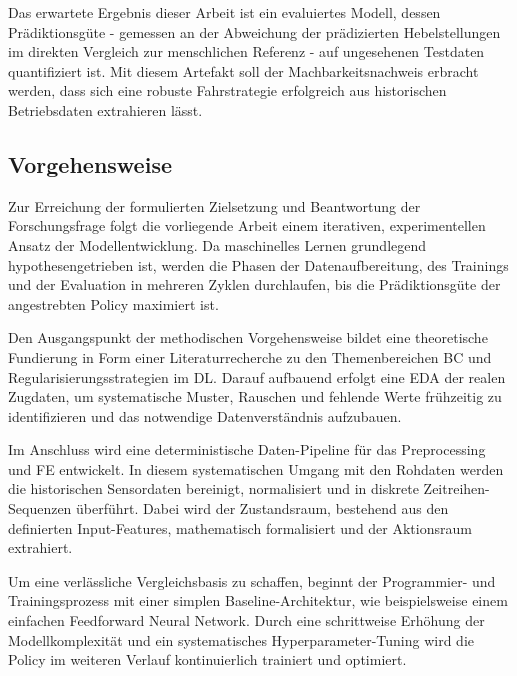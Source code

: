 Das erwartete Ergebnis dieser Arbeit ist ein evaluiertes Modell, dessen Prädiktionsgüte - gemessen an der Abweichung der prädizierten Hebelstellungen im direkten Vergleich zur menschlichen Referenz - auf ungesehenen Testdaten quantifiziert ist. 
Mit diesem Artefakt soll der Machbarkeitsnachweis erbracht werden, dass sich eine robuste Fahrstrategie erfolgreich aus historischen Betriebsdaten extrahieren lässt.

\subsection{Vorgehensweise}
\label{subsec:vorgehensweise}

Zur Erreichung der formulierten Zielsetzung und Beantwortung der Forschungsfrage folgt die vorliegende Arbeit einem iterativen, experimentellen Ansatz der Modellentwicklung. 
Da maschinelles Lernen grundlegend hypothesengetrieben ist, werden die Phasen der Datenaufbereitung, des Trainings und der Evaluation in mehreren Zyklen durchlaufen, bis die Prädiktionsgüte der angestrebten Policy maximiert ist.

Den Ausgangspunkt der methodischen Vorgehensweise bildet eine theoretische Fundierung in Form einer Literaturrecherche zu den Themenbereichen \gls{BC} und Regularisierungsstrategien im \gls{DL}. 
Darauf aufbauend erfolgt eine \gls{EDA} der realen Zugdaten, um systematische Muster, Rauschen und fehlende Werte frühzeitig zu identifizieren und das notwendige Datenverständnis aufzubauen.

Im Anschluss wird eine deterministische Daten-Pipeline für das Preprocessing und \gls{FE} entwickelt. 
In diesem systematischen Umgang mit den Rohdaten werden die historischen Sensordaten bereinigt, normalisiert und in diskrete Zeitreihen-Sequenzen überführt. 
Dabei wird der Zustandsraum, bestehend aus den definierten Input-Features, mathematisch formalisiert und der Aktionsraum extrahiert.
 
Um eine verlässliche Vergleichsbasis zu schaffen, beginnt der Programmier- und Trainingsprozess mit einer simplen Baseline-Architektur, wie beispielsweise einem einfachen Feedforward Neural Network. 
Durch eine schrittweise Erhöhung der Modellkomplexität und ein systematisches Hyperparameter-Tuning wird die Policy im weiteren Verlauf kontinuierlich trainiert und optimiert.

